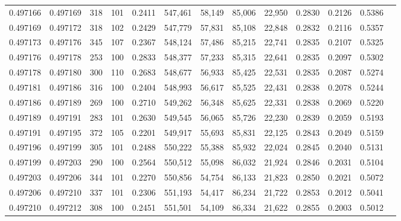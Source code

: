 \begin{tabular}{rrrrrrrrrrrrr}
0.497166 & 0.497169 &   318 & 101 &                                     0.2411 & 547,461 &  58,149 &  85,006 &  22,950 & 0.2830 & 0.2126 & 0.5386 \\
0.497169 & 0.497172 &   318 & 102 &                                     0.2429 & 547,779 &  57,831 &  85,108 &  22,848 & 0.2832 & 0.2116 & 0.5357 \\
0.497173 & 0.497176 &   345 & 107 &                                     0.2367 & 548,124 &  57,486 &  85,215 &  22,741 & 0.2835 & 0.2107 & 0.5325 \\
0.497176 & 0.497178 &   253 & 100 &                                     0.2833 & 548,377 &  57,233 &  85,315 &  22,641 & 0.2835 & 0.2097 & 0.5302 \\
0.497178 & 0.497180 &   300 & 110 &                                     0.2683 & 548,677 &  56,933 &  85,425 &  22,531 & 0.2835 & 0.2087 & 0.5274 \\
0.497181 & 0.497186 &   316 & 100 &                                     0.2404 & 548,993 &  56,617 &  85,525 &  22,431 & 0.2838 & 0.2078 & 0.5244 \\
0.497186 & 0.497189 &   269 & 100 &                                     0.2710 & 549,262 &  56,348 &  85,625 &  22,331 & 0.2838 & 0.2069 & 0.5220 \\
0.497189 & 0.497191 &   283 & 101 &                                     0.2630 & 549,545 &  56,065 &  85,726 &  22,230 & 0.2839 & 0.2059 & 0.5193 \\
0.497191 & 0.497195 &   372 & 105 &                                     0.2201 & 549,917 &  55,693 &  85,831 &  22,125 & 0.2843 & 0.2049 & 0.5159 \\
0.497196 & 0.497199 &   305 & 101 &                                     0.2488 & 550,222 &  55,388 &  85,932 &  22,024 & 0.2845 & 0.2040 & 0.5131 \\
0.497199 & 0.497203 &   290 & 100 &                                     0.2564 & 550,512 &  55,098 &  86,032 &  21,924 & 0.2846 & 0.2031 & 0.5104 \\
0.497203 & 0.497206 &   344 & 101 &                                     0.2270 & 550,856 &  54,754 &  86,133 &  21,823 & 0.2850 & 0.2021 & 0.5072 \\
0.497206 & 0.497210 &   337 & 101 &                                     0.2306 & 551,193 &  54,417 &  86,234 &  21,722 & 0.2853 & 0.2012 & 0.5041 \\
0.497210 & 0.497212 &   308 & 100 &                                     0.2451 & 551,501 &  54,109 &  86,334 &  21,622 & 0.2855 & 0.2003 & 0.5012 \\

\end{tabular}
